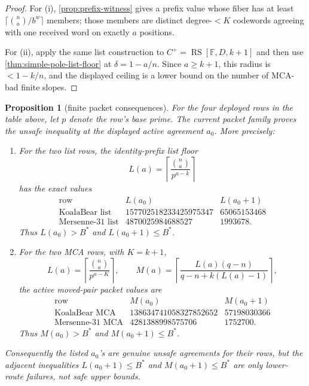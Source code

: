 \documentclass[a4paper,11pt]{amsart}
\newtheorem{proposition}[theorem]{Proposition}
\theoremstyle{remark}
\newcommand{\F}{\mathbb F}
\newcommand{\RS}{\operatorname{RS}}
\begin{document}
\begin{proof}
For (i), \cref{prop:prefix-witness} gives a prefix value whose fiber has at least \(\lceil\binom na/b^w\rceil\) members; those members are distinct degree-\(<K\) codewords agreeing with one received word on exactly \(a\) positions.

For (ii), apply the same list construction to \(C^+=\RS[\F,D,k+1]\) and then use \cref{thm:simple-pole-list-floor} at \(\delta=1-a/n\).  Since \(a\ge k+1\), this radius is \(<1-k/n\), and the displayed ceiling is a lower bound on the number of MCA-bad finite slopes.
\end{proof}

\begin{proposition}[finite packet consequences]\label{prop:finite-packet-consequences}
For the four deployed rows in the table above, let \(p\) denote the row's base prime.  The current packet family proves the unsafe inequality at the displayed active agreement \(a_0\).  More precisely:
\begin{enumerate}[label=\textup{(\roman*)}]
\item For the two list rows, the identity-prefix list floor
\[
        L(a)=\left\lceil\frac{\binom na}{p^{a-k}}\right\rceil
\]
has the exact values
\[
\begin{array}{c|cc}
\text{row} & L(a_0) & L(a_0+1)\\
\hline
\text{KoalaBear list} & 157702518233425975347 & 65065153468\\
\text{Mersenne-31 list} & 4870025984688527 & 1993678 .
\end{array}
\]
Thus \(L(a_0)>B^*\) and \(L(a_0+1)\le B^*\).
\item For the two MCA rows, with \(K=k+1\),
\[
        L(a)=\left\lceil\frac{\binom na}{p^{a-K}}\right\rceil,
        \qquad
        M(a)=\left\lceil \frac{L(a)(q-n)}{q-n+k(L(a)-1)}\right\rceil ,
\]
the active moved-pair packet values are
\[
\begin{array}{c|cc}
\text{row} & M(a_0) & M(a_0+1)\\
\hline
\text{KoalaBear MCA} & 138634741058327852652 & 57198030366\\
\text{Mersenne-31 MCA} & 4281388998575706 & 1752700 .
\end{array}
\]
Thus \(M(a_0)>B^*\) and \(M(a_0+1)\le B^*\).
\end{enumerate}
Consequently the listed \(a_0\)'s are genuine unsafe agreements for their rows, but the adjacent inequalities \(L(a_0+1)\le B^*\) and \(M(a_0+1)\le B^*\) are only lower-route failures, not safe upper bounds.
\end{proposition}
\end{document}
